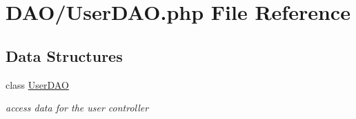 \hypertarget{_user_d_a_o_8php}{}\section{D\+A\+O/\+User\+D\+AO.php File Reference}
\label{_user_d_a_o_8php}
\subsection*{Data Structures}
\begin{DoxyCompactItemize}
\item 
class \hyperlink{class_user_d_a_o}{User\+D\+AO}
\begin{DoxyCompactList}\small\item\em access data for the user controller \end{DoxyCompactList}\end{DoxyCompactItemize}
